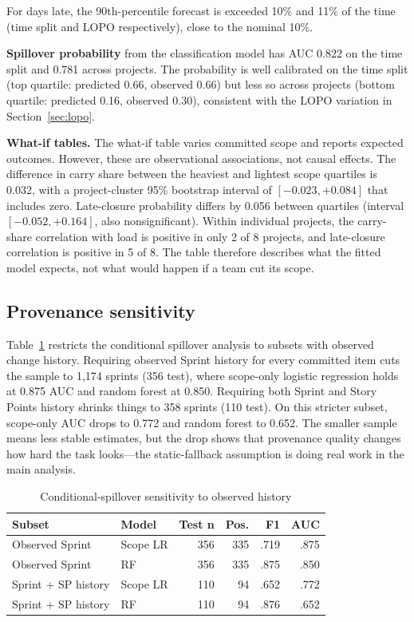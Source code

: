 \documentclass[conference]{IEEEtran}
\begin{document}
For days late, the 90th-percentile forecast is exceeded 10\% and 11\% of the time (time split and LOPO respectively), close to the nominal 10\%.

\textbf{Spillover probability} from the classification model has AUC 0.822 on the time split and 0.781 across projects.
The probability is well calibrated on the time split (top quartile: predicted 0.66, observed 0.66) but less so across projects (bottom quartile: predicted 0.16, observed 0.30), consistent with the LOPO variation in Section~\ref{sec:lopo}.

\textbf{What-if tables.}
The what-if table varies committed scope and reports expected outcomes.
However, these are observational associations, not causal effects.
The difference in carry share between the heaviest and lightest scope quartiles is 0.032, with a project-cluster 95\% bootstrap interval of $[-0.023, +0.084]$ that includes zero.
Late-closure probability differs by 0.056 between quartiles (interval $[-0.052, +0.164]$, also nonsignificant).
Within individual projects, the carry-share correlation with load is positive in only 2 of 8 projects, and late-closure correlation is positive in 5 of 8.
The table therefore describes what the fitted model expects, not what would happen if a team cut its scope.

\subsection{Provenance sensitivity}
\label{sec:provenance}

Table~\ref{tab:prov} restricts the conditional spillover analysis to subsets with observed change history.
Requiring observed Sprint history for every committed item cuts the sample to 1,174 sprints (356 test), where scope-only logistic regression holds at 0.875 AUC and random forest at 0.850.
Requiring both Sprint and Story Points history shrinks things to 358 sprints (110 test).
On this stricter subset, scope-only AUC drops to 0.772 and random forest to 0.652.
The smaller sample means less stable estimates, but the drop shows that provenance quality changes how hard the task looks---the static-fallback assumption is doing real work in the main analysis.

\begin{table}[!htb]
\centering\scriptsize
\caption{Conditional-spillover sensitivity to observed history}
\label{tab:prov}
\setlength{\tabcolsep}{2.4pt}
\begin{tabular}{@{}llrrrr@{}}
\toprule
Subset & Model & Test n & Pos. & F1 & AUC\\
\midrule
Observed Sprint & Scope LR & 356 & 335 & .719 & .875\\
Observed Sprint & RF & 356 & 335 & .875 & .850\\
Sprint + SP history & Scope LR & 110 & 94 & .652 & .772\\
Sprint + SP history & RF & 110 & 94 & .876 & .652\\
\bottomrule
\end{tabular}
\end{table}
\end{document}
